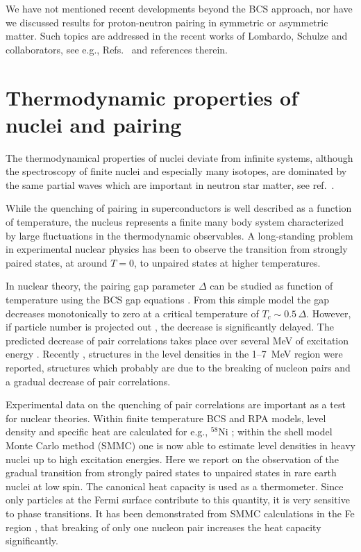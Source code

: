 \documentclass{elsart}
\begin{document}
We have not mentioned recent developments beyond the BCS approach,
nor have we discussed results for proton-neutron pairing in symmetric
or asymmetric matter. Such topics are addressed in the recent works
of Lombardo, Schulze and collaborators, see e.g., Refs.\ 
\cite{dh2003,ls2000,ls2001} and references therein. 




\section{Thermodynamic properties of nuclei and pairing}\label{sec:sec3}

The thermodynamical properties of nuclei deviate from infinite systems, 
although the spectroscopy of finite nuclei and especially many isotopes, 
are dominated by the same partial waves which are important 
in neutron star matter, see ref.~\cite{dh2003}.

While the quenching of pairing in superconductors is well described as a 
function of temperature, the nucleus represents a finite many body system 
characterized by large fluctuations in the thermodynamic observables. A 
long-standing problem in experimental nuclear physics has been to observe the 
transition from strongly paired states, at around $T=0$, to unpaired states at 
higher temperatures. 

In nuclear theory, the pairing gap parameter $\Delta$ can be studied as 
function of temperature using the BCS gap equations \cite{SY63,Go81}. From this
simple model the gap decreases monotonically to zero at a critical temperature 
of $T_c\sim 0.5\,\Delta$. However, if particle number is projected out 
\cite{FS76,DK95}, the decrease is significantly delayed. The predicted decrease
of pair correlations takes place over several MeV of excitation energy 
\cite{DK95}. Recently \cite{andreas2000}, structures in the level 
densities in the 1--7~MeV region were reported, structures which 
probably are due to the breaking of 
nucleon pairs and a gradual decrease of pair correlations. 

Experimental data on the quenching of pair correlations are important as a 
test for nuclear theories. Within finite temperature BCS and RPA models, level 
density and specific heat are calculated for e.g., $^{58}$Ni \cite{Ng90}; 
within the shell model Monte Carlo method (SMMC) \cite{LJ93,KD97} one is now 
able to estimate level densities \cite{Or97} in heavy nuclei \cite{WK98} up to 
high excitation energies. 
Here we report on the observation of the gradual 
transition from strongly paired states to unpaired states in rare earth nuclei 
at low spin. The canonical heat capacity is used as a thermometer. Since only 
particles at the Fermi surface contribute to this quantity, it is very 
sensitive to phase transitions. It has been demonstrated from SMMC calculations
in the Fe region \cite{RH98,AL99}, that breaking of only one nucleon pair 
increases the heat capacity significantly. 
\end{document}
